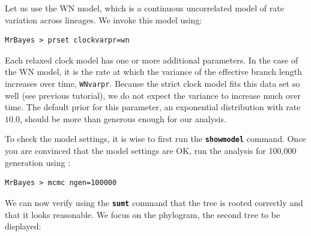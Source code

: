 \documentclass[12pt]{book}
\newcommand{\ttt}[1]{\texttt{#1}}
\newcommand{\tb}[1]{\ttt{\textbf{#1}}}
\begin{document}
Let us use the WN model, which is a continuous uncorrelated model of rate variation across lineages. We invoke this model using:

\small
\begin{singlespacing}
\begin{verbatim}
MrBayes > prset clockvarpr=wn
\end{verbatim}
\end{singlespacing}
\normalsize

Each relaxed clock model has one or more additional parameters. In the case of the WN model, it is
the rate at which the variance of the effective branch length increases over time, \ttt{WNvarpr}.
Because the strict clock model fits this data set so well (see previous tutorial), we do not expect
the variance to increase much over time. The default prior for this parameter, an exponential
distribution with rate $10.0$, should be more than generous enough for our analysis.

To check the model settings, it is wise to first run the \tb{showmodel} command. Once you are
convinced that the model settings are OK, run the analysis for 100,000 generation using :

\small
\begin{singlespacing}
\begin{verbatim}
MrBayes > mcmc ngen=100000
\end{verbatim}
\end{singlespacing}
\normalsize

We can now verify using the \tb{sumt} command that the tree is rooted correctly and that it
looks reasonable. We focus on the phylogram, the second tree to be displayed:
\end{document}

